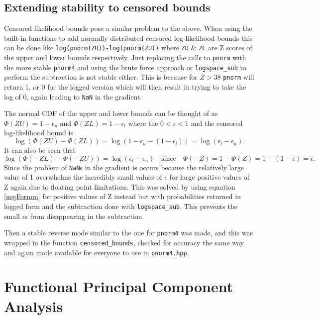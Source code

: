 \documentclass[11pt]{article}\usepackage[]{graphicx}\usepackage[]{color}
\begin{document}
\begin{appendices}
\subsection{Extending stability to censored bounds} 	\label{astable2}
Censored likelihood bounds pose a similar problem to the above. When using the built-in functions to add normally distributed censored log-likelihood bounds this can be done like \texttt{log(pnorm(ZU))-log(pnorm(ZU))} where \texttt{ZU} \& \texttt{ZL} are Z scores of the upper and lower bounds respectively. Just replacing the calls to \texttt{pnorm} with the more stable \texttt{pnorm4} and using the brute force approach or \texttt{logspace\_sub} to perform the subtraction is not stable either. This is because for $Z > 38$ \texttt{pnorm} will return 1, or 0 for the logged version which will then result in trying to take the log of 0, again leading to \texttt{NaN} in the gradient.

The normal CDF of the upper and lower bounds can be thought of as $\Phi(ZU)=1-\epsilon_u$ and $\Phi(ZL)=1-\epsilon_l$ where the $0 < \epsilon < 1$ and the censored log-likelihood bound is 
\begin{equation}
	\log(\Phi(ZU)-\Phi(ZL)) = \log(1-\epsilon_u-(1-\epsilon_l)) = \log(\epsilon_l-\epsilon_u). 
\end{equation}
It can also be seen that 
\begin{equation}\label{negFormm}
	\log(\Phi(-ZL)-\Phi(-ZU)) = \log(\epsilon_l-\epsilon_u) \quad \text{since} \quad \Phi(-Z) = 1-\Phi(Z) = 1-(1-\epsilon) = \epsilon.
\end{equation}
Since the problem of \texttt{NaN}s in the gradient is occurs because the relatively large value of 1 overwhelms the incredibly small values of $\epsilon$ for large positive values of Z again due to floating point limitations. This was solved by using equation \ref{negFormm} for positive values of Z instead but with probabilities returned in logged form and the subtraction done with \texttt{logspace\_sub}. This prevents the small $\epsilon$s from disappearing in the subtraction.   

Then a stable reverse mode similar to the one for \texttt{pnorm4} was made, and this was wrapped in the function \texttt{censored\_bounds}, checked for accuracy the same way and again made available for everyone to use in \texttt{pnorm4.hpp}. 

\section{Functional Principal Component Analysis}\label{afpca}


\end{appendices}
\end{document}

